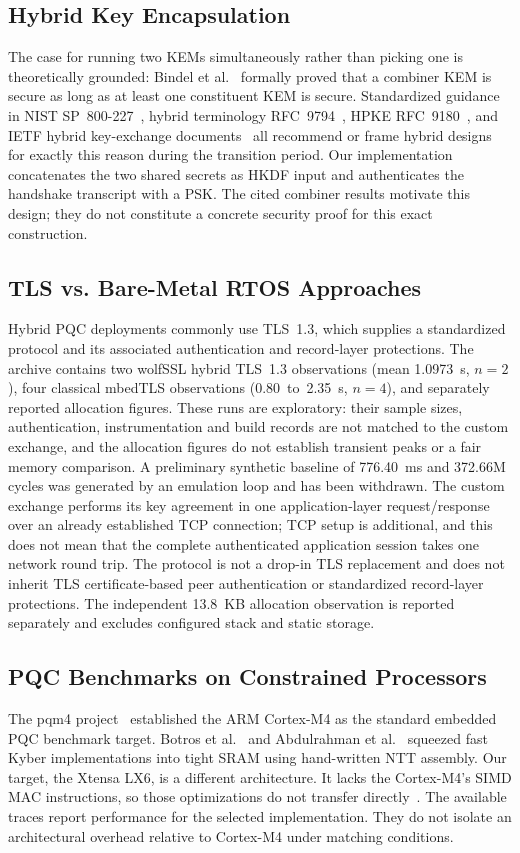 \documentclass[journal, 10pt]{IEEEtran}
\begin{document}
\subsection{Hybrid Key Encapsulation}
The case for running two KEMs simultaneously rather than picking one is theoretically grounded: Bindel et al.~\cite{b8} formally proved that a combiner KEM is secure as long as at least one constituent KEM is secure. Standardized guidance in NIST SP~800-227~\cite{b9}, hybrid terminology RFC~9794~\cite{b31}, HPKE RFC~9180~\cite{b32}, and IETF hybrid key-exchange documents~\cite{b16,b17} all recommend or frame hybrid designs for exactly this reason during the transition period. Our implementation concatenates the two shared secrets as HKDF input and authenticates the handshake transcript with a PSK. The cited combiner results motivate this design; they do not constitute a concrete security proof for this exact construction.

\subsection{TLS vs. Bare-Metal RTOS Approaches}
Hybrid PQC deployments commonly use TLS~1.3, which supplies a standardized protocol and its associated authentication and record-layer protections. The archive contains two wolfSSL hybrid TLS~1.3 observations (mean 1.0973~s, $n=2$), four classical mbedTLS observations (0.80~to~2.35~s, $n=4$), and separately reported allocation figures. These runs are exploratory: their sample sizes, authentication, instrumentation and build records are not matched to the custom exchange, and the allocation figures do not establish transient peaks or a fair memory comparison. A preliminary synthetic baseline of 776.40~ms and 372.66M cycles was generated by an emulation loop and has been withdrawn. The custom exchange performs its key agreement in one application-layer request/response over an already established TCP connection; TCP setup is additional, and this does not mean that the complete authenticated application session takes one network round trip. The protocol is not a drop-in TLS replacement and does not inherit TLS certificate-based peer authentication or standardized record-layer protections. The independent 13.8~KB allocation observation is reported separately and excludes configured stack and static storage.

\subsection{PQC Benchmarks on Constrained Processors}
The pqm4 project~\cite{b7} established the ARM Cortex-M4 as the standard embedded PQC benchmark target. Botros et al.~\cite{b6} and Abdulrahman et al.~\cite{b12} squeezed fast Kyber implementations into tight SRAM using hand-written NTT assembly. Our target, the Xtensa LX6, is a different architecture. It lacks the Cortex-M4's SIMD MAC instructions, so those optimizations do not transfer directly~\cite{b11}. The available traces report performance for the selected implementation. They do not isolate an architectural overhead relative to Cortex-M4 under matching conditions.
\end{document}
